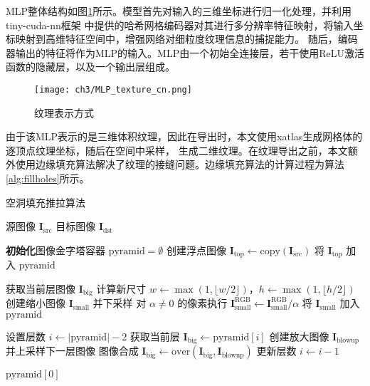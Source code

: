 MLP整体结构如图\ref{fig:mlp_texture_cn}所示。模型首先对输入的三维坐标进行归一化处理，并利用tiny-cuda-nn框架\cite{Muller_tiny-cuda-nn_2021}
中提供的哈希网格编码器对其进行多分辨率特征映射，将输入坐标映射到高维特征空间中，增强网络对细粒度纹理信息的捕捉能力。
随后，编码器输出的特征将作为MLP的输入。MLP由一个初始全连接层，若干使用ReLU激活函数的隐藏层，以及一个输出层组成。
\begin{figure}[htb]
  \centering
  \texttt{[image: ch3/MLP\_texture\_cn.png]}
  \caption{纹理表示方式}
  \label{fig:mlp_texture_cn}
\end{figure}

由于该MLP表示的是三维体积纹理，因此在导出时，本文使用xatlas\cite{yang_2021}生成网格体的逐顶点纹理坐标，随后在空间中采样，
生成二维纹理。在纹理导出之前，本文额外使用边缘填充算法解决了纹理的接缝问题。边缘填充算法的计算过程为算法\ref{alg:fillholes}所示。

\begin{algorithm}
  \caption{空洞填充推拉算法} %
  \label{alg:fillholes}
  \begin{algorithmic}[1]
  \REQUIRE 源图像 $\bm{I}_{\text{src}}$
  \ENSURE 目标图像 $\bm{I}_{\text{dst}}$
  
  \STATE \textbf{初始化}图像金字塔容器 $\text{pyramid} = \emptyset$
  \STATE 创建浮点图像 $\bm{I}_{\text{top}} \gets \text{copy}(\bm{I}_{\text{src}})$
  \STATE 将 $\bm{I}_{\text{top}}$ 加入 $\text{pyramid}$
  
      \STATE 获取当前层图像 $\bm{I}_{\text{big}}$
      \STATE 计算新尺寸 $w \gets \max(1, \lfloor w/2 \rfloor)$，$h \gets \max(1, \lfloor h/2 \rfloor)$
      \STATE 创建缩小图像 $\bm{I}_{\text{small}}$ 并下采样
      \STATE 对 $\alpha \neq 0$ 的像素执行 $\bm{I}_{\text{small}}^{\text{RGB}} \gets \bm{I}_{\text{small}}^{\text{RGB}} / \alpha$
      \STATE 将 $\bm{I}_{\text{small}}$ 加入 $\text{pyramid}$
  \ENDWHILE
  
  \STATE 设置层数 $i \gets |\text{pyramid}| - 2$
      \STATE 获取当前层 $\bm{I}_{\text{big}} \gets \text{pyramid}[i]$
      \STATE 创建放大图像 $\bm{I}_{\text{blowup}}$ 并上采样下一层图像
      \STATE 图像合成 $\bm{I}_{\text{big}} \gets \text{over}(\bm{I}_{\text{big}}, \bm{I}_{\text{blowup}})$
      \STATE 更新层数 $i \gets i - 1$
  \ENDWHILE

  \STATE \RETURN $\text{pyramid}[0]$
  \end{algorithmic}
\end{algorithm}

